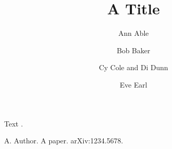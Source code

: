 \renewcommand{\arxiv}[1]{arXiv:#1}
\begin{frontmatter}
\title{A Title}
\begin{aug}
\author[A]{Ann Able}
\author[B]{Bob Baker}
\author{Cy Cole and Di Dunn}
\author{Eve Earl }
\address[A]{Department of Mathematics, McGill University}
\address[B]{Bernoulli Institute, University of Groningen}
\address[addrC]{Cole Institute}
\end{aug}
\end{frontmatter}
Text \cite{k}.
\begin{thebibliography}{1}
 A. Author. A paper. \arxiv{1234.5678}.
\end{thebibliography}

